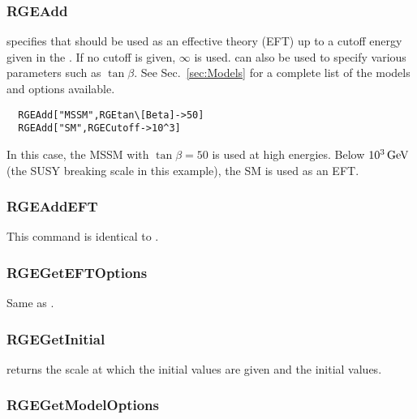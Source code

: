 \documentclass[10pt,a4paper,twoside]{scrartcl}
\begin{document}
\subsubsection{RGEAdd}

specifies that  should be used as an effective theory (EFT)
up to a cutoff energy given in the .  If no cutoff is
given, $\infty$ is used.   can also be used to specify
various parameters such as $\tan\beta$.  See Sec.~\ref{sec:Models} for a
complete list of the models and options available.

\begin{verbatim}
  RGEAdd["MSSM",RGEtan\[Beta]->50]
  RGEAdd["SM",RGECutoff->10^3]
\end{verbatim}
In this case, the MSSM with $\tan\beta=50$ is used at high energies.
Below $10^3\,\mathrm{GeV}$ (the SUSY breaking scale in this example), the SM is
used as an EFT.



\subsubsection{RGEAddEFT}

This command is identical to .

\subsubsection{RGEGetEFTOptions}

Same as .

\subsubsection{RGEGetInitial}

 returns the scale at which the initial values
are given and the initial values.
%
%

\subsubsection{RGEGetModelOptions}
\end{document}
